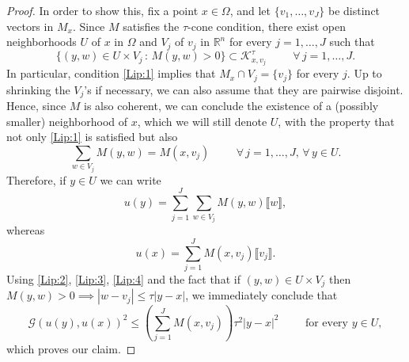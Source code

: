 \documentclass[a4paper,11pt,reqno]{amsart}
\theoremstyle{definition}
\numberwithin{equation}{section}
\numberwithin{subsection}{section}
\newcommand{\R}{\mathbb{R}}
\newcommand{\G}{\mathcal{G}}
\newcommand{\K}{\mathcal{K}}
\begin{document}
\begin{proof}
In order to show this, fix a point $x \in \Omega$, and let $\{v_{1}, \dots, v_{J} \}$ be distinct vectors in $M_{x}$. Since $M$ satisfies the $\tau$-cone condition, there exist open neighborhoods $U$ of $x$ in $\Omega$ and $V_{j}$ of $v_{j}$ in $\R^{n}$ for every $j = 1,\dots,J$ such that
\begin{equation} \label{Lip:1}
\lbrace (y,w) \in U \times V_{j} \, \colon \, M(y,w) > 0 \rbrace \subset \K^{\tau}_{x,v_{j}} \hspace{1cm} \forall \, j=1,\dots,J.
\end{equation} 
In particular, condition \eqref{Lip:1} implies that $M_{x} \cap V_{j} = \{v_{j}\}$ for every $j$. Up to shrinking the $V_{j}$'s if necessary, we can also assume that they are pairwise disjoint. Hence, since $M$ is also coherent, we can conclude the existence of a (possibly smaller) neighborhood of $x$, which we will still denote $U$, with the property that not only \eqref{Lip:1} is satisfied but also
\begin{equation} \label{Lip:2}
\sum_{w \in V_{j}} M(y,w) = M(x,v_{j}) \hspace{1cm} \forall \, j=1,\dots,J, \, \forall \, y \in U. 
\end{equation}
Therefore, if $y \in U$ we can write
\begin{equation} \label{Lip:3}
u(y) = \sum_{j=1}^{J} \sum_{w \in V_{j}} M(y,w) \llbracket w \rrbracket,
\end{equation}
whereas
\begin{equation} \label{Lip:4}
u(x) = \sum_{j=1}^{J} M(x,v_{j}) \llbracket v_{j} \rrbracket.
\end{equation}
Using \eqref{Lip:2}, \eqref{Lip:3}, \eqref{Lip:4} and the fact that if $(y,w) \in U \times V_{j}$ then $M(y,w) > 0 \implies |w - v_{j}| \leq \tau |y - x|$, we immediately conclude that
\begin{equation} \label{Lip:5}
\G(u(y), u(x))^{2} \leq \left( \sum_{j=1}^{J} M(x,v_{j}) \right) \tau^{2} |y - x|^{2} \hspace{1cm} \mbox{for every } y \in U, 
\end{equation}
which proves our claim.


\end{proof}
\end{document}
